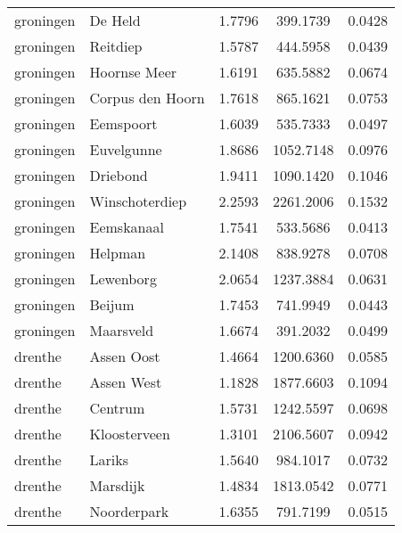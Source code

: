 \begin{longtable}{llccc}
	groningen     & De Held                          & 1.7796  & 399.1739  & 0.0428          \\
	groningen     & Reitdiep                         & 1.5787  & 444.5958  & 0.0439          \\
	groningen     & Hoornse Meer                     & 1.6191  & 635.5882  & 0.0674          \\
	groningen     & Corpus den Hoorn                 & 1.7618  & 865.1621  & 0.0753          \\
	groningen     & Eemspoort                        & 1.6039  & 535.7333  & 0.0497          \\
	groningen     & Euvelgunne                       & 1.8686  & 1052.7148 & 0.0976          \\
	groningen     & Driebond                         & 1.9411  & 1090.1420 & 0.1046          \\
	groningen     & Winschoterdiep                   & 2.2593  & 2261.2006 & 0.1532          \\
	groningen     & Eemskanaal                       & 1.7541  & 533.5686  & 0.0413          \\
	groningen     & Helpman                          & 2.1408  & 838.9278  & 0.0708          \\
	groningen     & Lewenborg                        & 2.0654  & 1237.3884 & 0.0631          \\
	groningen     & Beijum                           & 1.7453  & 741.9949  & 0.0443          \\
	groningen     & Maarsveld                        & 1.6674  & 391.2032  & 0.0499          \\
	drenthe       & Assen Oost                       & 1.4664  & 1200.6360 & 0.0585          \\
	drenthe       & Assen West                       & 1.1828  & 1877.6603 & 0.1094          \\
	drenthe       & Centrum                          & 1.5731  & 1242.5597 & 0.0698          \\
	drenthe       & Kloosterveen                     & 1.3101  & 2106.5607 & 0.0942          \\
	drenthe       & Lariks                           & 1.5640  & 984.1017  & 0.0732          \\
	drenthe       & Marsdijk                         & 1.4834  & 1813.0542 & 0.0771          \\
	drenthe       & Noorderpark                      & 1.6355  & 791.7199  & 0.0515          \\

\end{longtable}
